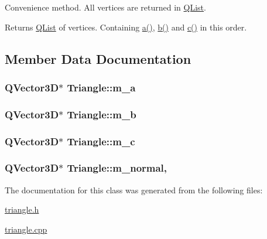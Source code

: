 Convenience method. All vertices are returned in \hyperlink{singleton_q_list}{Q\+List}. 

\begin{DoxyReturn}{Returns}
\hyperlink{singleton_q_list}{Q\+List} of vertices. Containing \hyperlink{class_triangle_a430bf0a9d8eaf20ea7bdefcd8082588c}{a()}, \hyperlink{class_triangle_a8327124c9b9b752be94187c9fbf3f460}{b()} and \hyperlink{class_triangle_a61f6c0245df276555de6d1b1a98840b8}{c()} in this order. 
\end{DoxyReturn}


\subsection{Member Data Documentation}
\hypertarget{class_triangle_a38f859bd8a6291d1fe460dbcf3c937c8}{
\subsubsection[{m\+\_\+a}]{\setlength{\rightskip}{0pt plus 5cm}Q\+Vector3\+D$\ast$ Triangle\+::m\+\_\+a\hspace{0.3cm}{\ttfamily [protected]}}}\label{class_triangle_a38f859bd8a6291d1fe460dbcf3c937c8}
\hypertarget{class_triangle_a783a7fcacbfa566c37dfd3fa8c6f44fd}{
\subsubsection[{m\+\_\+b}]{\setlength{\rightskip}{0pt plus 5cm}Q\+Vector3\+D$\ast$ Triangle\+::m\+\_\+b\hspace{0.3cm}{\ttfamily [protected]}}}\label{class_triangle_a783a7fcacbfa566c37dfd3fa8c6f44fd}
\hypertarget{class_triangle_ae39dcbf0b28b543900380517bbef628c}{
\subsubsection[{m\+\_\+c}]{\setlength{\rightskip}{0pt plus 5cm}Q\+Vector3\+D$\ast$ Triangle\+::m\+\_\+c\hspace{0.3cm}{\ttfamily [protected]}}}\label{class_triangle_ae39dcbf0b28b543900380517bbef628c}
\hypertarget{class_triangle_a86922a6a07e847f2df3b9310af273d8a}{
\subsubsection[{m\+\_\+normal}]{\setlength{\rightskip}{0pt plus 5cm}Q\+Vector3\+D$\ast$ Triangle\+::m\+\_\+normal\hspace{0.3cm}{\ttfamily [mutable]}, {\ttfamily [protected]}}}\label{class_triangle_a86922a6a07e847f2df3b9310af273d8a}


The documentation for this class was generated from the following files\+:\begin{DoxyCompactItemize}
\item 
\hyperlink{triangle_8h}{triangle.\+h}\item 
\hyperlink{triangle_8cpp}{triangle.\+cpp}\end{DoxyCompactItemize}
